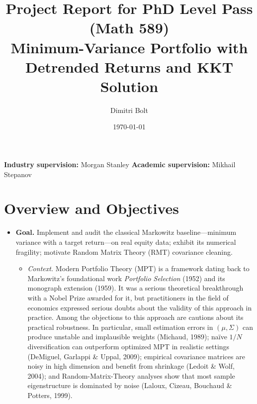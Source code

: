 \documentclass[11pt]{article}
\title{Project Report for PhD Level Pass (Math 589)\\\large Minimum-Variance Portfolio with Detrended Returns and KKT Solution}
\author{Dimitri Bolt}
\date{\today}
\begin{document}
	\maketitle
	
	\noindent\textbf{Industry supervision:} Morgan Stanley \quad
	\textbf{Academic supervision:} Mikhail Stepanov
	
	\bigskip
	
	\section{Overview and Objectives}
	\begin{itemize}
		\item \textbf{Goal.} Implement and audit the classical Markowitz baseline---minimum variance with a target return---on real equity data; exhibit its numerical fragility; motivate Random Matrix Theory (RMT) covariance cleaning.
		\begin{itemize}
			\item \textit{Context.} Modern Portfolio Theory (MPT) is a framework dating back to Markowitz's foundational work \textit{Portfolio Selection} (1952) and its monograph extension (1959).
It was a serious theoretical breakthrough with a Nobel Prize awarded for it, but practitioners in the field of economics expressed serious doubts about the validity of this approach in practice. Among the objections to this approach are cautions about its practical robustness.
 In particular, small estimation errors in $(\mu,\Sigma)$ can produce unstable and implausible weights (Michaud, 1989); naïve $1/N$ diversification can outperform optimized MPT in realistic settings (DeMiguel, Garlappi \& Uppal, 2009); empirical covariance matrices are noisy in high dimension and benefit from shrinkage (Ledoit \& Wolf, 2004); and Random-Matrix-Theory analyses show that most sample eigenstructure is dominated by noise (Laloux, Cizeau, Bouchaud \& Potters, 1999). 
			 

\end{itemize}
\end{itemize}
\end{document}

